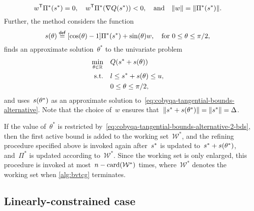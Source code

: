 \begin{equation*}
    w^{\T} \Pi^{\ast}(\sstep[\ast]) = 0, \quad w^{\T} \Pi^{\ast}(\nabla Q(\sstep[\ast])) < 0, \quad \text{and} \quad \norm{w} = \norm{\Pi^{\ast}(\sstep[\ast])}.
\end{equation*}
Further, the method considers the function
\begin{equation*}
    \sstep(\theta) \eqdef [\cos(\theta) - 1] \Pi^{\ast}(\sstep[\ast]) + \sin(\theta) w, \quad \text{for~$0 \le \theta \le \pi / 2$,}
\end{equation*}
finds an approximate solution~$\theta^{\ast}$ to the univariate problem
\begin{subequations}
    \begin{align}
        \min_{\theta \in \R}    & \quad Q(\sstep[\ast] + \sstep(\theta))\\
        \text{s.t.}             & \quad \xl \le \sstep[\ast] + \sstep(\theta) \le \xu, \label{eq:cobyqa-tangential-bounds-alternative-2-bds}\\
                                & \quad 0 \le \theta \le \pi / 2,
    \end{align}
\end{subequations}
and uses~$\sstep(\theta^{\ast})$ as an approximate solution to~\cref{eq:cobyqa-tangential-bounds-alternative}.
Note that the choice of~$w$ ensures that~$\norm{\sstep[\ast] + \sstep(\theta^{\ast})} = \norm{\sstep[\ast]} = \rad$.

If the value of~$\theta^{\ast}$ is restricted by~\cref{eq:cobyqa-tangential-bounds-alternative-2-bds}, then the first active bound is added to the working set~$\mathcal{W}^{\ast}$, and the refining procedure specified above is invoked again after~$\sstep[\ast]$ is updated to~$\sstep[\ast] + \sstep(\theta^{\ast})$, and~$\Pi^{\ast}$ is updated according to~$\mathcal{W}^{\ast}$.
Since the working set is only enlarged, this procedure is invoked at most~$n - \operatorname{card}(\mathcal{W}^{\ast})$ times, where~$\mathcal{W}^{\ast}$ denotes the working set when \cref{alg:bvtcg} terminates.


\subsection{Linearly-constrained case}
\label{subsec:lctcg}

